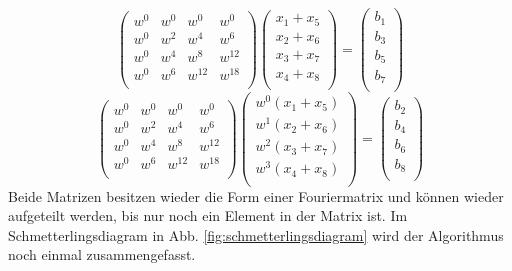 \begin{equation*}
\left( \begin{array}{cccc}
w^{0} & w^{0} & w^{0} & w^{0}\\
w^{0} & w^{2} & w^{4} & w^{6}\\
w^{0} & w^{4} & w^{8} & w^{12}\\
w^{0} & w^{6} & w^{12} & w^{18}\\
\end{array} \right)
\left( \begin{array}{cccc}
x_1 + x_5\\
x_2 + x_6\\
x_3 + x_7\\
x_4 + x_8\\
\end{array} \right)
=
\left( \begin{array}{cccc}
b_1\\
b_3\\
b_5\\
b_7\\
\end{array} \right)
\end{equation*} 
\begin{equation*}
\left( \begin{array}{cccc}
w^{0} & w^{0} & w^{0} & w^{0}\\
w^{0} & w^{2} & w^{4} & w^{6}\\
w^{0} & w^{4} & w^{8} & w^{12}\\
w^{0} & w^{6} & w^{12} & w^{18}\\
\end{array} \right)
\left( \begin{array}{cccc}
w^{0}(x_1 + x_5)\\
w^{1}(x_2 + x_6)\\
w^{2}(x_3 + x_7)\\
w^{3}(x_4 + x_8)\\
\end{array} \right)
=
\left( \begin{array}{cccc}
b_2\\
b_4\\
b_6\\
b_8\\
\end{array} \right)
\end{equation*} 
Beide Matrizen besitzen wieder die Form einer Fouriermatrix und können wieder aufgeteilt werden, bis nur noch ein Element in der Matrix ist.
Im Schmetterlingsdiagram in Abb. \ref{fig:schmetterlingsdiagram} wird der Algorithmus noch einmal zusammengefasst.
